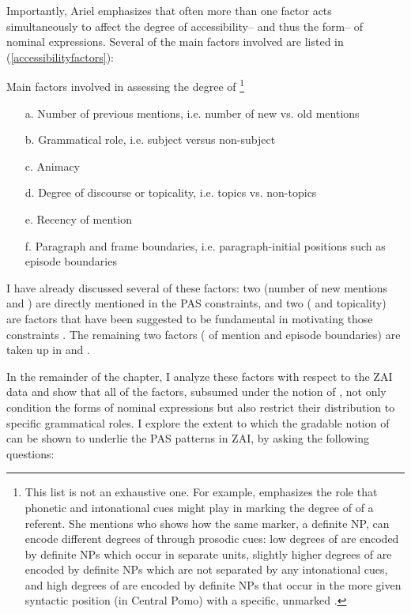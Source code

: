 \z

Importantly, Ariel emphasizes that often more than one factor acts simultaneously to affect the degree of accessibility-- and thus the form-- of nominal expressions. Several of the main factors involved are listed in (\ref{accessibilityfactors}): 

\ea\label{accessibilityfactors}  Main factors involved in assessing the degree of \footnote{This list is not an exhaustive one. For example, \citet[50]{ariel2001} emphasizes the role that phonetic and intonational cues might play in marking the degree of  of a referent. She mentions \citet{mithun1995} who shows how the same  marker, a definite NP, can encode different degrees of  through prosodic cues: low degrees of  are encoded by definite NPs which occur in separate  units, slightly higher degrees of  are encoded by definite NPs which are not separated by any intonational cues, and high degrees of  are encoded by definite NPs that occur in the more given syntactic position (in Central Pomo) with a specific, unmarked .} \citep{ariel1990,ariel2001}

\begin{itemize}
\item[a.] Number of previous mentions, i.e. number of new vs. old mentions
\item[b.] Grammatical role, i.e. subject versus non-subject
\item[c.] Animacy
\item[d.] Degree of discourse  or topicality, i.e. topics vs. non-topics 
\item[e.] Recency of mention
\item[f.] Paragraph and frame boundaries, i.e. paragraph-initial positions such as episode boundaries
\end{itemize}
\z
 
I have already discussed several of these factors: two (number of new mentions and ) are directly mentioned in the PAS constraints, and two ( and topicality) are factors that have been suggested to be fundamental in motivating those constraints \citep{haspelmath2006,everett2009}. The remaining two factors ( of mention and episode boundaries) are taken up in  and . 

In the remainder of the chapter, I analyze these  factors with respect to the ZAI data and show that all of the factors, subsumed under the notion of , not only condition the forms of nominal expressions but also restrict their distribution to specific grammatical roles. I explore the extent to which the gradable notion of  can be shown to underlie the PAS patterns in ZAI, by asking the following questions:

